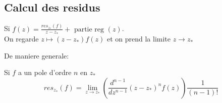 \documentclass[../main.tex]{subfiles}
\begin{document}
\subsection{Calcul des residus}
\begin{exemple}
Si $f( z) = \frac{res_{z_*} ( f) }{z-z_*} + \text{ partie reg } ( z) $.\\
On regarde $z\mapsto ( z-z_*) f( z) $ et on prend la limite $z\to z_*$ 
\end{exemple}
De maniere generale:
\begin{lemma}
Si $f$ a un pole d'ordre $n$ en $z_*$ 
\[ 
res_{z_*} ( f) = \lim_{z\to z_*} ( \frac{d^{n-1}}{dz^{n-1}}( z-z_*) ^{n}f( z) ) \frac{1}{( n-1) !}
\]

\end{lemma}
\end{document}
